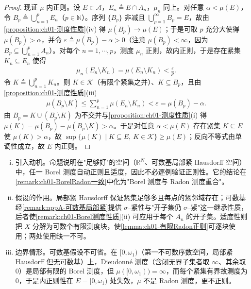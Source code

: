 \documentclass[../../main.tex]{subfiles}%
\begin{document}
\begin{proof}
现证 $\mu$ 内正则。设 $E\in\mathcal{A}$，$E_n\triangleq E\cap A_n$，$\mu_n$ 同上。对任意 $\alpha<\mu(E)$，令 $B_p\triangleq\bigcup_{n=1}^pE_n$（$p\in\mathbb{N}$）。序列 $\{B_p\}$ 非减且 $\bigcup_{p=1}^\infty B_p=E$，故由\cref{proposition:ch01-测度性质}(iv) 得 $\mu(B_p)\to\mu(E)$；于是可取 $p$ 充分大使得 $\mu(B_p)>\alpha$，并令 $\varepsilon\triangleq\mu(B_p)-\alpha>0$（注意 $\mu(B_p)<\infty$，因为 $B_p\subseteq\bigcup_{n=1}^pA_n$）。对每个 $n=1,\cdots ,p$，测度 $\mu_n$ 正则，故内正则，于是存在紧集 $K_n\subseteq E_n$ 使得
\begin{align*}
\mu_n(E_n\setminus K_n)=\mu(E_n\setminus K_n)<\frac{\varepsilon}{p}.
\end{align*}
令 $K\triangleq\bigcup_{n=1}^pK_n$。则 $K\in\mathcal{K}$（有限个紧集之并）、$K\subseteq B_p$，且由\cref{proposition:ch01-测度性质}(iii)
\begin{align*}
\mu\left(B_p\setminus K\right)\leqslant\sum_{n=1}^p\mu(E_n\setminus K_n)<\varepsilon=\mu(B_p)-\alpha.
\end{align*}
由 $B_p=K\cup(B_p\setminus K)$ 为不交并与\cref{proposition:ch01-测度性质}(i) 得 $\mu(K)=\mu(B_p)-\mu(B_p\setminus K)>\alpha$。于是对任意 $\alpha<\mu(E)$ 存在紧集 $K\subseteq E$ 使 $\mu(K)>\alpha$，故 $\sup\{\mu(K)\mid K\subseteq E,\ K\in\mathcal{K}\}\geqslant\mu(E)$；反向不等式由单调性成立，故 $E$ 内正则。
\end{proof}

\begin{remark}\label{remark:ch01-可数基Borel正则注}
\begin{enumerate}[(i)]
\item 引入动机。命题说明在"足够好"的空间（$\mathbb{R}^N$、可数基局部紧 Hausdorff 空间）中，任一 Borel 测度自动正则且适度，因此不必逐例验证正则性。它的结论在\cref{remark:ch01-BorelRadon一致}中化为"Borel 测度与 Radon 测度重合"。
\item 假设的作用。局部紧 Hausdorff 保证紧集足够多且每点的紧邻域存在；可数基经\cref{remark:appA-可数基局部紧}提供 $\sigma$--紧性与"开子集仍 $\sigma$--紧"这一继承性质，后者使\cref{remark:ch01-Borel测度性质}(ii) 可应用于每个 $A_n$ 的开子集。适度性则把 $X$ 分解为可数个有限测度块，使\cref{lemma:ch01-有限Radon正则}可逐块使用；两处使用缺一不可。
\item 边界情形。可数基假设不可省。在 $[0,\omega_1)$（第一不可数序数空间，局部紧 Hausdorff 但无可数基）上，Dieudonné 测度（含闭无界子集者取 $\infty$、其余取 $0$）是局部有限的 Borel 测度，但 $\mu([0,\omega_1))=\infty$，而每个紧集有界故测度为 $0$，于是内正则性在 $E=[0,\omega_1)$ 处失效，$\mu$ 不是 Radon 测度，更不正则。
\end{enumerate}
\end{remark}
\end{document}
